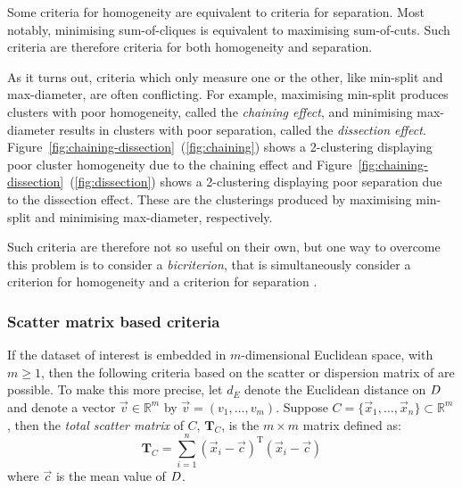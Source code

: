 Some criteria for homogeneity are equivalent to criteria for separation.  Most
notably, minimising sum-of-cliques is equivalent to maximising sum-of-cuts.
Such criteria are therefore criteria for both homogeneity and separation.



As it turns out, criteria which only measure one or the other, like min-split
and max-diameter, are often conflicting.  For example, maximising min-split
produces clusters with poor homogeneity, called the \textit{chaining effect},
and minimising max-diameter results in clusters with poor separation, called
the \textit{dissection effect}.
Figure~\ref{fig:chaining-dissection}~(\ref{fig:chaining}) shows a 2-clustering
displaying poor cluster homogeneity due to the chaining effect and
Figure~\ref{fig:chaining-dissection}~(\ref{fig:dissection}) shows a
2-clustering displaying poor separation due to the dissection effect.  These
are the clusterings produced by maximising min-split and minimising
max-diameter, respectively.

Such criteria are therefore not so useful on
their own, but one way to overcome this problem is to consider a
\textit{bicriterion}, that is simultaneously consider a criterion for
homogeneity and a criterion for separation \citep{delattre1980bicriterion}.

\subsubsection{Scatter matrix based criteria}
\label{sec:scatter-matrix-based}

If the dataset of interest is embedded in $m$-dimensional Euclidean space,
with $m \geq 1$, then the following criteria based on the scatter or
dispersion matrix of \citet{wilks60} are possible.  To make this more precise,
let $d_E$ denote the Euclidean distance on $D$ and denote a vector
$\vec{v} \in \mathbb{R}^m$ by $\vec{v} = (v_1,\dotsc,v_m)$.  Suppose $C =
\{\vec{x}_1,\dotsc,\vec{x}_n\} \subset \mathbb{R}^m$, then the \textit{total
  scatter matrix} of $C$, $\mathbf{T}_{C}$, is the $m \times m$ matrix defined
as:
\begin{equation*}
  \mathbf{T}_{C} = \sum_{i=1}^{n} (\vec{x}_i - \vec{c})^{\mathrm{T}}(\vec{x}_i - \vec{c})
\end{equation*}
where $\vec{c}$ is the mean value of $D$.

